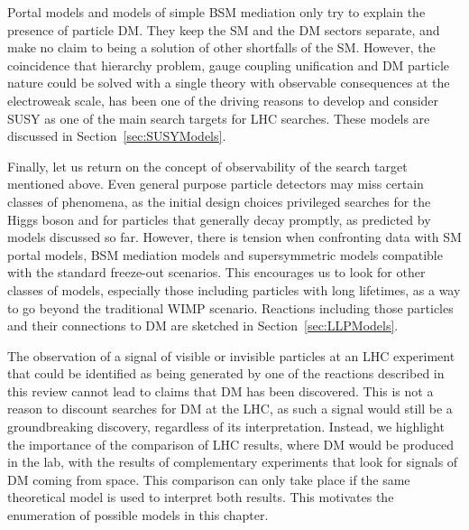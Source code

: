 



Portal models and models of simple BSM mediation only try to explain the presence of particle DM. They keep the SM and the DM sectors separate, and make no claim to being a solution of other shortfalls of the SM. However, the coincidence that hierarchy problem, gauge coupling unification and DM particle nature could be solved with a single theory with observable consequences at the electroweak scale, has been one of the driving reasons to develop and consider SUSY as one of the main search targets for LHC searches. These models are discussed in Section~\ref{sec:SUSYModels}.

Finally, let us return on the concept of observability of the search target mentioned above. Even general purpose particle detectors may miss certain classes of phenomena, as the initial design choices privileged searches for the Higgs boson and for particles that generally decay promptly, as predicted by models discussed so far. However, there is tension when confronting data with SM portal models, BSM mediation models and supersymmetric models compatible with the standard freeze-out scenarios. This encourages us to look for other classes of models, especially those including particles with long lifetimes, as a way to go beyond the traditional WIMP scenario. Reactions including those particles and their connections to DM are sketched in Section~\ref{sec:LLPModels}.

The observation of a signal of visible or invisible particles at an LHC experiment that could be identified as being generated by one of the reactions described in this review cannot lead to claims that DM has been discovered. This is not a reason to discount searches for DM at the LHC, as such a signal would still be a groundbreaking discovery, regardless of its interpretation. Instead, we highlight the importance of the comparison of LHC results, where DM would be produced in the lab, with the results of complementary experiments that look for signals of DM coming from space. This comparison can only take place if the same theoretical model is used to interpret both results. This motivates the enumeration of possible models in this chapter. 

